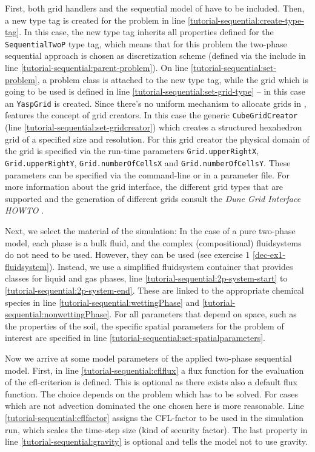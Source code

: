 First, both \Dune  grid handlers and the sequential model of \Dumux
have to be included. Then, a new type tag is created for the problem
in line \ref{tutorial-sequential:create-type-tag}.  In this case, the
new type tag inherits all properties defined for the \texttt{SequentialTwoP}
type tag, which means that for this problem the two-phase sequential approach
is chosen as discretization scheme (defined via the include in line
\ref{tutorial-sequential:parent-problem}). On line \ref{tutorial-sequential:set-problem},
a problem class is attached to the new type tag, while the grid which
is going to be used is defined in line \ref{tutorial-sequential:set-grid-type} --
in this case an \texttt{YaspGrid} is created. Since there's no uniform mechanism to
allocate grids in \Dune, \Dumux features the concept of grid creators.
In this case the generic \texttt{CubeGridCreator} (line \ref{tutorial-sequential:set-gridcreator}) which creates a
structured hexahedron grid of a specified size and resolution. For
this grid creator the  physical domain of the grid is specified via the
run-time parameters \texttt{Grid.upperRightX},
\texttt{Grid.upperRightY}, \texttt{Grid.numberOfCellsX} and
\texttt{Grid.numberOfCellsY}. These parameters can be specified via
the command-line or in a parameter file.
For more information about the \Dune grid interface, the different grid types
that are supported and the generation of different grids consult
the \textit{Dune Grid Interface HOWTO} \cite{DUNE-HP}.

Next, we select the material of the simulation: In the case of a pure two-phase
model, each phase is a bulk fluid, and the complex (compositional) fluidsystems
do not need to be used. However, they can be used (see exercise 1 \ref{dec-ex1-fluidsystem}).
Instead, we use a simplified fluidsystem container that provides classes
for liquid and gas phases, line \ref{tutorial-sequential:2p-system-start} to
\ref{tutorial-sequential:2p-system-end}. These are linked to the appropriate
chemical species in line \ref{tutorial-sequential:wettingPhase} and
\ref{tutorial-sequential:nonwettingPhase}. For all parameters that depend
on space, such as the properties of the soil, the specific spatial parameters
for the problem of interest are specified in line
\ref{tutorial-sequential:set-spatialparameters}.

Now we arrive at some model parameters of the applied two-phase sequential
model. First, in line  \ref{tutorial-sequential:cflflux} a flux function for the
evaluation of the cfl-criterion is defined. This is optional as there exists also
a default flux function. The choice depends on the problem which has to be solved.
For cases which are not advection dominated the one chosen here is more reasonable.
Line \ref{tutorial-sequential:cflfactor} assigns the CFL-factor to be used in the
simulation run, which scales the time-step size (kind of security factor). The last
property in line \ref{tutorial-sequential:gravity}
is optional and tells the model not to use gravity.

